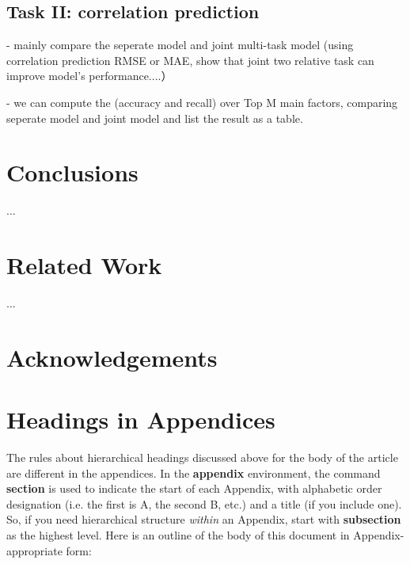 \documentclass{sigkddExp}
\begin{document}
\subsection{Task II: correlation prediction}

  - mainly compare the seperate model and joint multi-task model (using correlation prediction RMSE or MAE, show that joint two relative task can improve model's performance....）

  - we can compute the (accuracy and recall) over Top M main factors, comparing seperate model and joint model and list the result as a table.


\section{Conclusions}
...

\section{Related Work}
...

\section{Acknowledgements}

%

%
%
\appendix
\section{Headings in Appendices}
The rules about hierarchical headings discussed above for
the body of the article are different in the appendices.
In the \textbf{appendix} environment, the command
\textbf{section} is used to
indicate the start of each Appendix, with alphabetic order
designation (i.e. the first is A, the second B, etc.) and
a title (if you include one).  So, if you need
hierarchical structure
\textit{within} an Appendix, start with \textbf{subsection} as the
highest level. Here is an outline of the body of this
document in Appendix-appropriate form:
\end{document}
